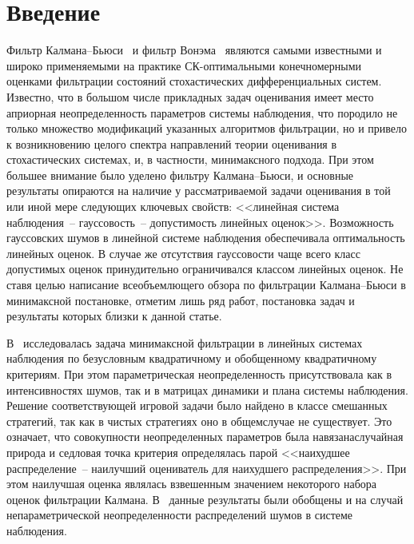 

\thispagestyle{headings}

\begin{multicols}{2}


\label{st\stat}

 \section{Введение}

 Фильтр Калмана--Бьюси~\cite{kalmanbucy} и фильтр Вонэма~\cite{wonham} являются
 самыми известными и широко применяемыми на практике СК-оптимальными конечномерными оценками
 фильтрации состояний стохастических дифференциальных систем. Известно, что в большом
 числе прикладных задач
 оценивания имеет место априорная неопределенность пара\-мет\-ров системы наблюдения, что
 породило не только множество модификаций указанных алгоритмов
 фильтрации, но и привело к возникновению целого спектра направлений
 теории оценивания в стохастических системах, и, в частности,
 мини\-макс\-ного подхода. При этом большее внимание было уделено фильтру
 Калмана--Бьюси, и основные результаты опираются на
 наличие у рассматриваемой задачи оценивания в той или иной мере следующих ключевых
 свойств: <<линейная система наблюдения~-- гауссовость~-- допустимость линейных
 оценок>>. Возможность гауссовских шумов в линейной системе наблюдения
 обеспечивала оптимальность линейных
 оценок. В случае же отсутствия гауссо\-вости чаще всего класс
 допустимых оценок принудительно ограничивался классом линейных оценок.
 Не ставя целью написание всеобъемлющего обзора по
 фильтрации Калмана--Бьюси в минимаксной постановке, отметим лишь ряд
 работ, постановка задач и результаты которых близки к данной статье.


 В~\cite{m_m} исследовалась задача минимаксной фильтрации в линейных
 системах наблюдения по безусловным квадратичному и
 обобщенному квадратичному критериям. При этом параметрическая
 неопределенность присутствовала как в интенсивностях шумов, так и в
 матрицах динамики и плана системы наблюдения. Решение
 соответствующей игровой задачи было найдено в классе смешанных
 стратегий, так как в чистых стратегиях оно в общем\linebreak случае не
 существует. Это означает, что совокупности неопределенных
 параметров была навязана\linebreak случайная природа и седловая точка
 критерия определялась парой <<наихудшее распределение~-- наилучший оцениватель для наихудшего
 распределения>>. При этом наилучшая оценка являлась взвешенным
 значением некоторого набора оценок фильтрации Калмана. В~\cite{an}
 данные результаты были обобщены и на случай непараметрической
 неопределенности распределений шумов в системе наблюдения.


\end{multicols}

